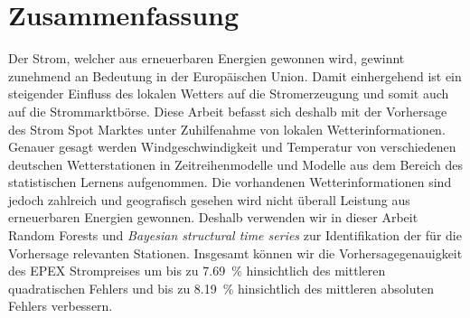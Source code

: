 
\chapter*{Zusammenfassung}

\begin{center}
  \begin{minipage}{12cm}
    \begin{sloppypar}
			Der Strom, welcher aus erneuerbaren Energien gewonnen wird, gewinnt zunehmend an Bedeutung in der Europ{\"a}ischen Union. Damit einhergehend ist ein steigender Einfluss des lokalen Wetters auf die Stromerzeugung und somit auch auf die Strommarktb{\"o}rse. Diese Arbeit befasst sich deshalb mit der Vorhersage des Strom Spot Marktes unter Zuhilfenahme von lokalen Wetterinformationen. Genauer gesagt werden Windgeschwindigkeit und Temperatur von verschiedenen deutschen Wetterstationen in Zeitreihenmodelle und Modelle aus dem Bereich des statistischen Lernens aufgenommen. Die vorhandenen Wetterinformationen sind jedoch zahlreich und geografisch gesehen wird nicht {\"u}berall Leistung aus erneuerbaren Energien gewonnen. Deshalb verwenden wir in dieser Arbeit Random Forests und \emph{Bayesian structural time series} zur Identifikation der f{\"u}r die Vorhersage relevanten Stationen. Insgesamt k{\"o}nnen wir die Vorhersagegenauigkeit des EPEX Strompreises um bis zu \SI{7.69}{\percent} hinsichtlich des mittleren quadratischen Fehlers und bis zu \SI{8.19}{\percent} hinsichtlich des mittleren absoluten Fehlers verbessern.
    \end{sloppypar}
  \end{minipage}
\end{center}